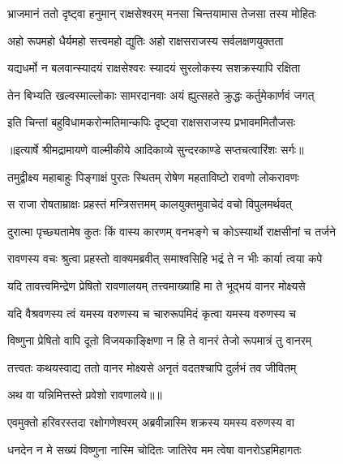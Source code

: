 \twolineshloka
{भ्राजमानं ततो दृष्ट्वा हनुमान् राक्षसेश्वरम्}
{मनसा चिन्तयामास तेजसा तस्य मोहितः} %

\twolineshloka
{अहो रूपमहो धैर्यमहो सत्त्वमहो द्युतिः}
{अहो राक्षसराजस्य सर्वलक्षणयुक्तता} %

\twolineshloka
{यद्यधर्मो न बलवान्स्यादयं राक्षसेश्वरः}
{स्यादयं सुरलोकस्य सशक्रस्यापि रक्षिता} %

\twolineshloka
{तेन बिभ्यति खल्वस्माल्लोकाः सामरदानवाः}
{अयं ह्युत्सहते क्रुद्धः कर्तुमेकार्णवं जगत्} %

\twolineshloka
{इति चिन्तां बहुविधामकरोन्मतिमान्कपिः}
{दृष्ट्वा राक्षसराजस्य प्रभावममितौजसः} %


{॥इत्यार्षे श्रीमद्रामायणे वाल्मीकीये आदिकाव्ये सुन्दरकाण्डे सप्तचत्वारिंशः सर्गः॥}


\twolineshloka
{तमुद्वीक्ष्य महाबाहुः पिङ्गाक्षं पुरतः स्थितम्}
{रोषेण महताविष्टो रावणो लोकरावणः} %

\twolineshloka
{स राजा रोषताम्राक्षः प्रहस्तं मन्त्रिसत्तमम्}
{कालयुक्तमुवाचेदं वचो विपुलमर्थवत्} %

\twolineshloka
{दुरात्मा पृच्छ्यतामेष कुतः किं वास्य कारणम्}
{वनभङ्गे च कोऽस्यार्थो राक्षसीनां च तर्जने} %

\twolineshloka
{रावणस्य वचः श्रुत्वा प्रहस्तो वाक्यमब्रवीत्}
{समाश्वसिहि भद्रं ते न भीः कार्या त्वया कपे} %

\twolineshloka
{यदि तावत्त्वमिन्द्रेण प्रेषितो रावणालयम्}
{तत्त्वमाख्याहि मा ते भूद्भयं वानर मोक्ष्यसे} %

\twolineshloka
{यदि वैश्रवणस्य त्वं यमस्य वरुणस्य च}
{चारुरूपमिदं कृत्वा यमस्य वरुणस्य च} %

\twolineshloka
{विष्णुना प्रेषितो वापि दूतो विजयकाङ्क्षिणा}
{न हि ते वानरं तेजो रूपमात्रं तु वानरम्} %

\twolineshloka
{तत्त्वतः कथयस्वाद्य ततो वानर मोक्ष्यसे}
{अनृतं वदतश्चापि दुर्लभं तव जीवितम्} %

{अथ वा यन्निमित्तस्ते प्रवेशो रावणालये॥॥} %

\addtocounter{shlokacount}{1}

\twolineshloka
{एवमुक्तो हरिवरस्तदा रक्षोगणेश्वरम्}
{अब्रवीन्नास्मि शक्रस्य यमस्य वरुणस्य वा} %

\twolineshloka
{धनदेन न मे सख्यं विष्णुना नास्मि चोदितः}
{जातिरेव मम त्वेषा वानरोऽहमिहागतः} %

